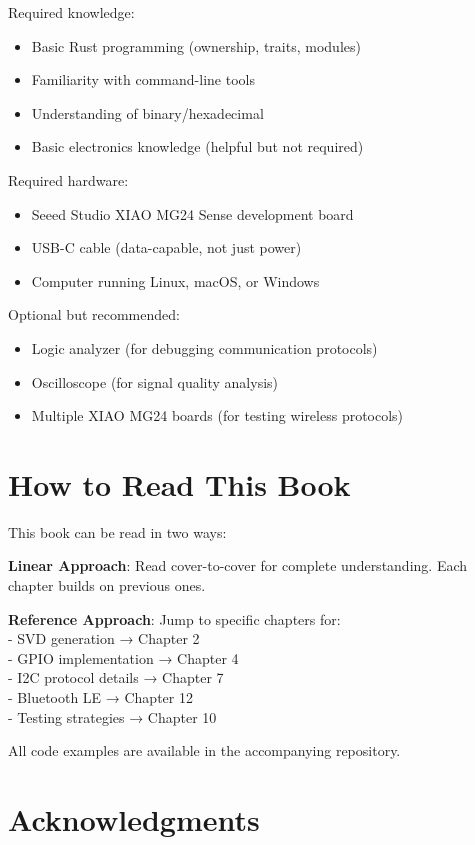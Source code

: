 \documentclass[11pt,a4paper,twoside,openright]{book}
\begin{document}
Required knowledge:
\begin{itemize}
    \item Basic Rust programming (ownership, traits, modules)
    \item Familiarity with command-line tools
    \item Understanding of binary/hexadecimal
    \item Basic electronics knowledge (helpful but not required)
\end{itemize}

Required hardware:
\begin{itemize}
    \item Seeed Studio XIAO MG24 Sense development board
    \item USB-C cable (data-capable, not just power)
    \item Computer running Linux, macOS, or Windows
\end{itemize}

Optional but recommended:
\begin{itemize}
    \item Logic analyzer (for debugging communication protocols)
    \item Oscilloscope (for signal quality analysis)
    \item Multiple XIAO MG24 boards (for testing wireless protocols)
\end{itemize}

\section*{How to Read This Book}

This book can be read in two ways:

\textbf{Linear Approach}: Read cover-to-cover for complete understanding. Each chapter builds on previous ones.

\textbf{Reference Approach}: Jump to specific chapters for:
\\- SVD generation → Chapter 2
\\- GPIO implementation → Chapter 4
\\- I2C protocol details → Chapter 7
\\- Bluetooth LE → Chapter 12
\\- Testing strategies → Chapter 10

All code examples are available in the accompanying repository.

\section*{Acknowledgments}
\end{document}
